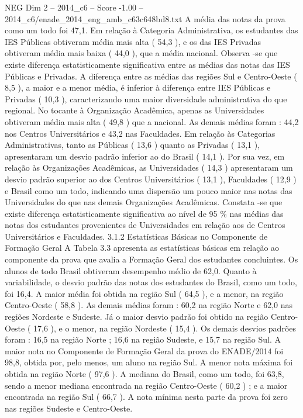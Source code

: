 \begin{textsample}{NEG Dim 2 – 2014\_c6 – Score -1.00 – 2014\_c6/enade\_2014\_eng\_amb\_c63c648bd8.txt}
A média das notas da prova como um todo foi 47,1.
Em relação à Categoria Administrativa, os estudantes das IES Públicas obtiveram média mais alta ( 54,3 ), e os das IES Privadas obtiveram média mais baixa ( 44,0 ), que a média nacional.
Observa -se que existe diferença estatisticamente significativa entre as médias das notas das IES Públicas e Privadas.
A diferença entre as médias das regiões Sul e Centro-Oeste ( 8,5 ), a maior e a menor média, é inferior à diferença entre IES Públicas e Privadas ( 10,3 ), caracterizando uma maior diversidade administrativa do que regional.
No tocante à Organização Acadêmica, apenas as Universidades obtiveram média mais alta ( 49,8 ) que a nacional.
As demais médias foram : 44,2 nos Centros Universitários e 43,2 nas Faculdades.
Em relação às Categorias Administrativas, tanto as Públicas ( 13,6 ) quanto as Privadas ( 13,1 ), apresentaram um desvio padrão inferior ao do Brasil ( 14,1 ).
Por sua vez, em relação às Organizações Acadêmicas, as Universidades ( 14,3 ) apresentaram um desvio padrão superior ao dos Centros Universitários ( 13,1 ), Faculdades ( 12,9 ) e Brasil como um todo, indicando uma dispersão um pouco maior nas notas das Universidades do que nas demais Organizações Acadêmicas.
Constata -se que existe diferença estatisticamente significativa ao nível de 95 \% nas médias das notas dos estudantes provenientes de Universidades em relação aos de Centros Universitários e Faculdades. 3.1.2 Estatísticas Básicas no Componente de Formação Geral A Tabela 3.3 apresenta as estatísticas básicas em relação ao componente da prova que avalia a Formação Geral dos estudantes concluintes.
Os alunos de todo Brasil obtiveram desempenho médio de 62,0.
Quanto à variabilidade, o desvio padrão das notas dos estudantes do Brasil, como um todo, foi 16,4.
A maior média foi obtida na região Sul ( 64,5 ), e a menor, na região Centro-Oeste ( 58,8 ).
As demais médias foram : 60,2 na região Norte e 62,0 nas regiões Nordeste e Sudeste.
Já o maior desvio padrão foi obtido na região Centro-Oeste ( 17,6 ), e o menor, na região Nordeste ( 15,4 ).
Os demais desvios padrões foram : 16,5 na região Norte ; 16,6 na região Sudeste, e 15,7 na região Sul.
A maior nota no Componente de Formação Geral da prova do ENADE/2014 foi 98,8, obtida por, pelo menos, um aluno na região Sul.
A menor nota máxima foi obtida na região Norte ( 97,6 ).
A mediana do Brasil, como um todo, foi 63,8, sendo a menor mediana encontrada na região Centro-Oeste ( 60,2 ) ; e a maior encontrada na região Sul ( 66,7 ).
A nota mínima nesta parte da prova foi zero nas regiões Sudeste e Centro-Oeste.

\end{textsample}

